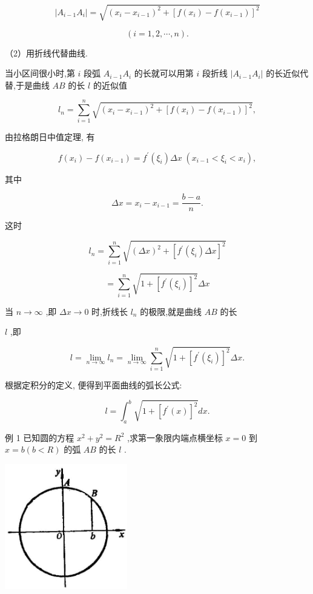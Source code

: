 \documentclass[lang=cn,newtx,10pt,scheme=chinese]{elegantbook}
\begin{document}
\[
\left| {{A}_{i - 1}{A}_{i}}\right| = \sqrt{{\left( {x}_{i} - {x}_{i - 1}\right) }^{2} + {\left\lbrack f\left( {x}_{i}\right) - f\left( {x}_{i - 1}\right) \right\rbrack }^{2}}
\]

\[
\left( {i = 1,2,\cdots ,n}\right) \text{.}
\]

（2）用折线代替曲线.

当小区间很小时,第 \(i\) 段弧 \({A}_{i - 1}{A}_{i}\) 的长就可以用第 \(i\) 段折线 \(\left| {{A}_{i - 1}{A}_{i}}\right|\) 的长近似代替,于是曲线 \({AB}\) 的长 \(l\) 的近似值

\[
{l}_{n} = \mathop{\sum }\limits_{{i = 1}}^{n}\sqrt{{\left( {x}_{i} - {x}_{i - 1}\right) }^{2} + {\left\lbrack f\left( {x}_{i}\right) - f\left( {x}_{i - 1}\right) \right\rbrack }^{2}}, \tag{1}
\]

由拉格朗日中值定理, 有

\[
f\left( {x}_{i}\right) - f\left( {x}_{i - 1}\right) = {f}^{\prime }\left( {\xi }_{i}\right) {\Delta x}\;\left( {{x}_{i - 1} < {\xi }_{i} < {x}_{i}}\right) ,
\]

其中

\[
{\Delta x} = {x}_{i} - {x}_{i - 1} = \frac{b - a}{n}.
\]

这时

\[
{l}_{n} = \mathop{\sum }\limits_{{i = 1}}^{n}\sqrt{{\left( \Delta x\right) }^{2} + {\left\lbrack {f}^{\prime }\left( {\xi }_{i}\right) \Delta x\right\rbrack }^{2}}
\]

\[
= \mathop{\sum }\limits_{{i = 1}}^{n}\sqrt{1 + {\left\lbrack {f}^{\prime }\left( {\xi }_{i}\right) \right\rbrack }^{2}}{\Delta x}
\]

当 \(n \rightarrow \infty\) ,即 \({\Delta x} \rightarrow 0\) 时,折线长 \({l}_{n}\) 的极限,就是曲线 \({AB}\) 的长

\(l\) ,即

\[
l = \mathop{\lim }\limits_{{n \rightarrow \infty }}{l}_{n} = \mathop{\lim }\limits_{{n \rightarrow \infty }}\mathop{\sum }\limits_{{i = 1}}^{n}\sqrt{1 + {\left\lbrack {f}^{\prime }\left( {\xi }_{i}\right) \right\rbrack }^{2}}{\Delta x}.
\]

根据定积分的定义, 便得到平面曲线的弧长公式:

\[
l = {\int }_{a}^{b}\sqrt{1 + {\left\lbrack {f}^{\prime }\left( x\right) \right\rbrack }^{2}}{dx}.
\]

例 1 已知圆的方程 \({x}^{2} + {y}^{2} = {R}^{2}\) ,求第一象限内端点横坐标 \(x = 0\) 到 \(x = b\left( {b < R}\right)\) 的弧 \({AB}\) 的长 \(l\) .

\begin{center}
\includegraphics[max width=0.4\textwidth]{images/01912c18-5c3f-733d-b775-749ba9897a9d_242_691071.jpg}
\end{center}
\end{document}
